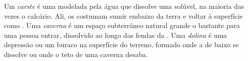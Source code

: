 \begin{definition}\label{def:g9:landforms:karst}
Um \emph{carste} é uma  modelada pela água que
dissolve uma  solúvel, na maioria das vezes o calcário. Ali, os 
costumam sumir embaixo da terra e voltar à superfície como .
Uma \emph{caverna} é um espaço subterrâneo natural grande
o bastante para uma pessoa entrar, dissolvido ao longo das fendas da
. Uma \emph{dolina} é uma depressão ou um buraco na
superfície do terreno, formado onde a  de baixo se dissolve ou onde
o teto de uma caverna desaba.
\end{definition}

